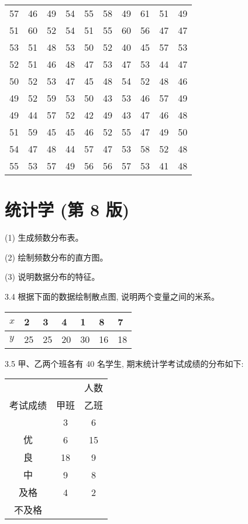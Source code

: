 \documentclass[10pt]{article}
\begin{document}
\begin{CJK*}{UTF8}{bsmi}
\begin{center}
\begin{tabular}{llllllllll}
\hline
57 & 46 & 49 & 54 & 55 & 58 & 49 & 61 & 51 & 49 \\
51 & 60 & 52 & 54 & 51 & 55 & 60 & 56 & 47 & 47 \\
53 & 51 & 48 & 53 & 50 & 52 & 40 & 45 & 57 & 53 \\
52 & 51 & 46 & 48 & 47 & 53 & 47 & 53 & 44 & 47 \\
50 & 52 & 53 & 47 & 45 & 48 & 54 & 52 & 48 & 46 \\
49 & 52 & 59 & 53 & 50 & 43 & 53 & 46 & 57 & 49 \\
49 & 44 & 57 & 52 & 42 & 49 & 43 & 47 & 46 & 48 \\
51 & 59 & 45 & 45 & 46 & 52 & 55 & 47 & 49 & 50 \\
54 & 47 & 48 & 44 & 57 & 47 & 53 & 58 & 52 & 48 \\
55 & 53 & 57 & 49 & 56 & 56 & 57 & 53 & 41 & 48 \\
\hline
\end{tabular}
\end{center}

\section*{统计学 (第 8 版)}
(1) 生成频数分布表。

(2) 绘制频数分布的直方图。

(3) 说明数据分布的特征。

3.4 根据下面的数据绘制散点图, 说明两个变量之间的米系。

\begin{center}
\begin{tabular}{lllllll}
\hline
$x$ & 2 & 3 & 4 & 1 & 8 & 7 \\
\hline
$y$ & 25 & 25 & 20 & 30 & 16 & 18 \\
\hline
\end{tabular}
\end{center}

3.5 甲、乙两个班各有 40 名学生, 期末统计学考试成绩的分布如下:

\begin{center}
\begin{tabular}{ccc}
\hline
 &  & 人数 \\
考试成绩 & 甲班 & 乙班 \\
\cline { 3 - 4 }
 & 3 & 6 \\
优 & 6 & 15 \\
良 & 18 & 9 \\
中 & 9 & 8 \\
及格 & 4 & 2 \\
不及格 &  &  \\
\hline
\end{tabular}
\end{center}


\end{CJK*}
\end{document}
